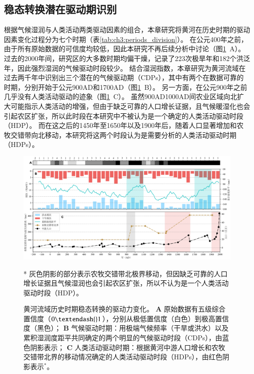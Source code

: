 
\subsection{稳态转换潜在驱动期识别}

根据气候湿润与人类活动两类驱动因素的组合，本章研究将黄河在历史时期的驱动因素变化过程分为七个时期（表\ref{tab:ch3:periods_division}）。
在公元400年之前，由于所有原始数据的可信度均较低，因此本研究不再后续分析中讨论（图\ref{fig:ch3:drivers}~A）。
过去的2000年间，研究区的大多数时期均偏干燥，记录了223次极旱年和182个洪泛年，因此强烈湿润的气候驱动时段较少。
结合湿润指数，本章研究为黄河流域在过去两千年中识别出三个潜在的气候驱动期（CDPs），其中有两个在数据可靠的时期，分别开始于公元900AD和1700AD（图\ref{fig:ch3:drivers}~B）。
另一方面，在公元900年之前几乎没有人类活动驱动的迹象（图\ref{fig:ch3:drivers}~C）。
虽然900AD\textendash{}1000AD间农业区域向北扩大可能指示人类活动的增强，但由于缺乏可靠的人口增长证据，且气候暖湿化也会引起农区扩张，所以此时段在本研究中不被认为是一个确定的人类活动驱动时段（HDP）。
而在这之后的1450年至1650年以及1900年后，随着人口显著增加和农牧交错带向北移动，本研究将这两个时段认为是需要分析的人类活动驱动时期（HDPs）。



\begin{figure}[!ht]
    \includegraphics[width=\textwidth]{img/ch3/ch3_drivers.png}
    \caption[黄河流域历史时期稳态转换的驱动力变化]{黄河流域历史时期稳态转换的驱动力变化。
    \textbf{A} 原始数据有五级综合置信度（$0 \textendash{} 1$），分别从极低置信度（白色）到极高置信度（黑色）；
    \textbf{B} 气候驱动时期：用极端气候频率（干旱或洪水）以及累积湿润度距平共同确定的两个明显的气候驱动时段（CDPs），由蓝色阴影表示；
    \textbf{C} 人类活动驱动时期：根据黄河中游人口增长和农牧交错带北界的移动情况确定的人类活动驱动时段（HDPs），由红色阴影表示$^*$。}
    \footnotesize
    * 灰色阴影的部分表示农牧交错带北极界移动，但因缺乏可靠的人口增长证据且气候湿润也会引起农区扩张，所以不认为是一个人类活动驱动时段（HDP）。\label{fig:ch3:drivers}
\end{figure}

